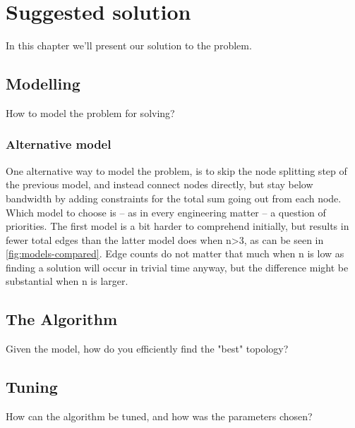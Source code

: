 \chapter{Suggested solution}

In this chapter we'll present our solution to the problem.

\section{Modelling}

How to model the problem for solving?

\subsection{Alternative model}

One alternative way to model the problem, is to skip the node splitting step of the previous model, and instead connect nodes directly, but stay below bandwidth by adding constraints for the total sum going out from each node. Which model to choose is -- as in every engineering matter -- a question of priorities. The first model is a bit harder to comprehend initially, but results in fewer total edges than the latter model does when n>3, as can be seen in \autoref{fig:models-compared}. Edge counts do not matter that much when n is low as finding a solution will occur in trivial time anyway, but the difference might be substantial when n is larger. 



\section{The Algorithm}

Given the model, how do you efficiently find the "best" topology?

\section{Tuning}

How can the algorithm be tuned, and how was the parameters chosen?
